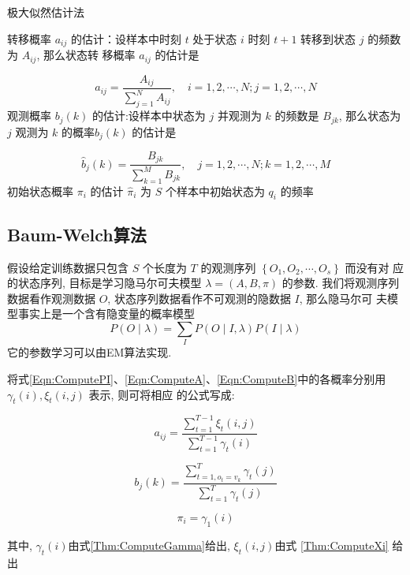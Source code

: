 \begin{algorithm}[htbp]
    \caption{极大似然估计法}
    

    转移概率 $ a_{i j} $ 的估计：设样本中时刻 $ t $ 处于状态 $ i $ 时刻 $ t+1 $ 转移到状态 $ j $ 的频数为 $ A_{i j} $, 那么状态转 移概率 $ a_{i j} $ 的估计是
    
    $$ \hat{a}_{i j}=\frac{A_{i j}}{\sum_{j=1}^{N} A_{i j}}, \quad i=1,2, \cdots, N ; j=1,2, \cdots, N $$
    \;
    观测概率 $ b_{j}(k) $ 的估计:设样本中状态为 $ j $ 并观测为 $ k $ 的频数是 $ B_{j k} $, 那么状态为 $ j $ 观测为 $ k $ 的概率$ b_{j}(k) $ 的估计是

    $$
    \hat{b}_{j}(k)=\frac{B_{j k}}{\sum_{k=1}^{M} B_{j k}}, \quad j=1,2, \cdots, N ; k=1,2, \cdots, M
    $$\;
    初始状态概率 $ \pi_{i} $ 的估计 $ \hat{\pi}_{i} $ 为 $ S $ 个样本中初始状态为 $ q_{i} $ 的频率\;

\end{algorithm}

\subsection{Baum-Welch算法}

假设给定训练数据只包含 $ S $ 个长度为 $ T $ 的观测序列 $ \left\{O_{1}, O_{2}, \cdots, O_{s}\right\} $ 而没有对 应的状态序列, 目标是学习隐马尔可夫模型 $ \lambda=(A, B, \pi) $ 的参数. 我们将观测序列数据看作观测数据 $ O $, 状态序列数据看作不可观测的隐数据 $ I $, 那么隐马尔可 夫模型事实上是一个含有隐变量的概率模型
$$
P(O \mid \lambda)=\sum_{I} P(O \mid I, \lambda) P(I \mid \lambda)
$$
它的参数学习可以由EM算法实现. 

\begin{theorem}
    将式\ref{Eqn:ComputePI}、\ref{Eqn:ComputeA}、\ref{Eqn:ComputeB}中的各概率分别用 $ \gamma_{t}(i), \xi_{t}(i, j) $ 表示, 则可将相应 的公式写成:

    $$ a_{i j}=\frac{\sum_{t=1}^{T-1} \xi_{t}(i, j)}{\sum_{t=1}^{T-1} \gamma_{t}(i)} $$

    $$ b_{j}(k)=\frac{\sum_{t=1, o_{t}=v_{k}}^{T} \gamma_{t}(j)}{\sum_{t=1}^{T} \gamma_{t}(j)} $$

    $$ \pi_{i}=\gamma_{1}(i) $$

    其中, $ \gamma_{t}(i)$由式\ref{Thm:ComputeGamma}给出, $\xi_{t}(i, j) $由式 \ref{Thm:ComputeXi} 给出
\end{theorem}


